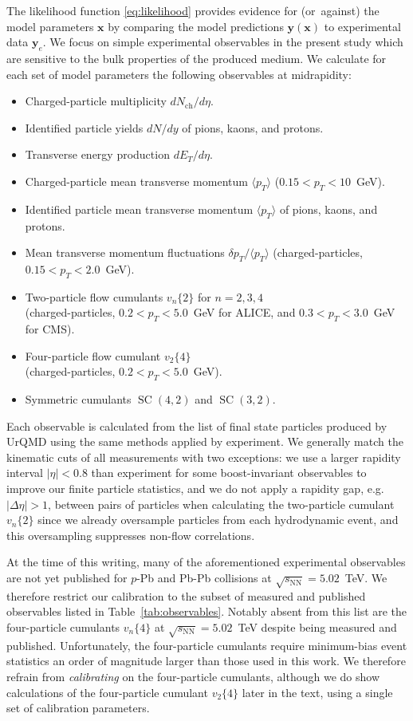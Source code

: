 \documentclass[aps,prc,reprint,amsmath,nofootinbib]{revtex4-1}
\newcommand{\sqrts}{\sqrt{s_\mathrm{NN}}}
\newcommand{\nch}{N_\text{ch}}
\newcommand{\vnk}[2]{v_#1\{#2\}}
\newcommand{\xv}{\mathbf x}
\newcommand{\yv}{\mathbf y}
\DeclareMathOperator{\SC}{SC}
\begin{document}
The likelihood function \eqref{eq:likelihood} provides evidence for \mbox{(or against)} the model parameters $\xv$ by comparing the model predictions $\yv(\xv)$ to experimental data $\yv_e$.
We focus on simple experimental observables in the present study which are sensitive to the bulk properties of the produced medium.
We calculate for each set of model parameters the following observables at midrapidity:
\begin{itemize}[leftmargin=1\parindent, itemsep=0pt]
  \item Charged-particle multiplicity $d\nch/d\eta$.
  \item Identified particle yields $dN/dy$ of pions, kaons, and protons.
  \item Transverse energy production $dE_T/d\eta$.
  \item Charged-particle mean transverse momentum $\langle p_T \rangle$ ($0.15 < p_T < 10$~GeV).
  \item Identified particle mean transverse momentum $\langle p_T \rangle$ of pions, kaons, and protons.
  \item Mean transverse momentum fluctuations $\delta p_T / \langle p_T \rangle$ (charged-particles, $0.15 < p_T < 2.0$~GeV).
  \item Two-particle flow cumulants $\vnk{n}{2}$ for $n=2,3,4$\\ (charged-particles, $0.2 < p_T < 5.0$~GeV for ALICE, and $0.3 < p_T < 3.0$~GeV for CMS).
  \item Four-particle flow cumulant $\vnk{2}{4}$ \\(charged-particles, $0.2 < p_T < 5.0$~GeV).
  \item Symmetric cumulants $\SC(4, 2)$ and $\SC(3,2)$.
\end{itemize}
Each observable is calculated from the list of final state particles produced by UrQMD using the same methods applied by experiment.
We generally match the kinematic cuts of all measurements with two exceptions: we use a larger rapidity interval $|\eta| < 0.8$ than experiment for some boost-invariant observables to improve our finite particle statistics, and we do not apply a rapidity gap, e.g.\ $|\Delta \eta| > 1$, between pairs of particles when calculating the two-particle cumulant $\vnk{n}{2}$ since we already oversample particles from each hydrodynamic event, and this oversampling suppresses non-flow correlations.

At the time of this writing, many of the aforementioned experimental observables are not yet published for $p$-Pb and Pb-Pb collisions at $\sqrts=5.02$~TeV.
We therefore restrict our calibration to the subset of measured and published observables listed in Table~\ref{tab:observables}.
Notably absent from this list are the four-particle cumulants $\vnk{n}{4}$ at $\sqrts=5.02$~TeV despite being measured and published.
Unfortunately, the four-particle cumulants require minimum-bias event statistics an order of magnitude larger than those used in this work.
We therefore refrain from \emph{calibrating} on the four-particle cumulants, although we do show calculations of the four-particle cumulant $\vnk{2}{4}$ later in the text, using a single set of calibration parameters.
\end{document}
